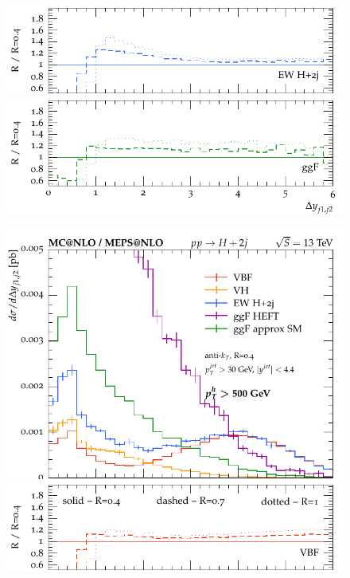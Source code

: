 \documentclass[10pt,prd,fleqn,superscriptaddress,notitlepage,nofootinbib,preprintnumbers,nobalancelastpage]{revtex4-1}
\begin{document}
\begin{figure}[p]
\begin{minipage}{.2925\textwidth}
    \includegraphics[width=\textwidth]{figures/channels/delta_y_jj12_pth200_rHJJ.pdf}
    \includegraphics[width=\textwidth]{figures/channels/delta_y_jj12_pth200_rGGH.pdf}
  \end{minipage}\hfill
  \begin{minipage}{.2925\textwidth}
    \includegraphics[width=\textwidth]{figures/channels/delta_y_jj12_pth500.pdf}
    \includegraphics[width=\textwidth]{figures/channels/delta_y_jj12_pth500_rVBF.pdf}

\end{minipage}
\end{figure}
\end{document}
